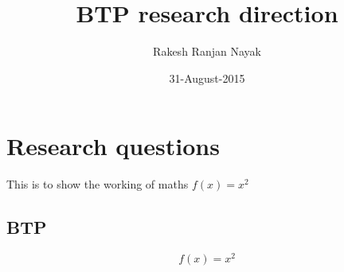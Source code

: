 \documentclass{article}
\title {BTP research direction}
\date{31-August-2015}
\author{Rakesh Ranjan Nayak}
\begin{document}
    \maketitle
    \section{Research questions}
        This is to show the working of maths $f(x) = x^2$
        \subsection{BTP}
            \begin{equation*}
              f(x) = x^2
            \end{equation*}
\end{document}
